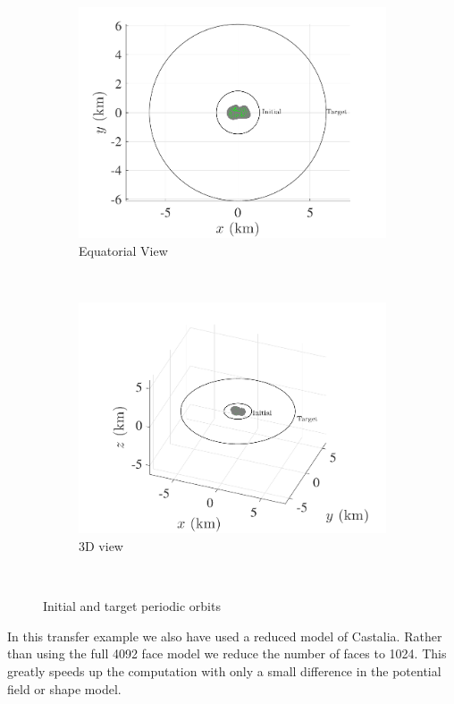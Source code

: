 \documentclass[]{aiaa-tc}%
\begin{document}
\begin{figure}[htbp]
    \centering 
    \begin{subfigure}[htbp]{0.5\textwidth} 
        \includegraphics[width=\textwidth]{initial_transfer} 
        \caption{Equatorial View} \label{fig:eq_initial_transfer} 
    \end{subfigure}~ %
    \begin{subfigure}[htbp]{0.5\textwidth} 
        \includegraphics[width=\textwidth]{initial_transfer_3d} 
        \caption{3D view} \label{fig:initial_transfer_3d} 
    \end{subfigure} ~ %
    \caption{Initial and target periodic orbits}
    \label{fig:initial_transfer} 
\end{figure}
In this transfer example we also have used a reduced model of Castalia.
Rather than using the full \num{4092} face model we reduce the number of faces to \num{1024}. 
This greatly speeds up the computation with only a small difference in the potential field or shape model.
\end{document}

